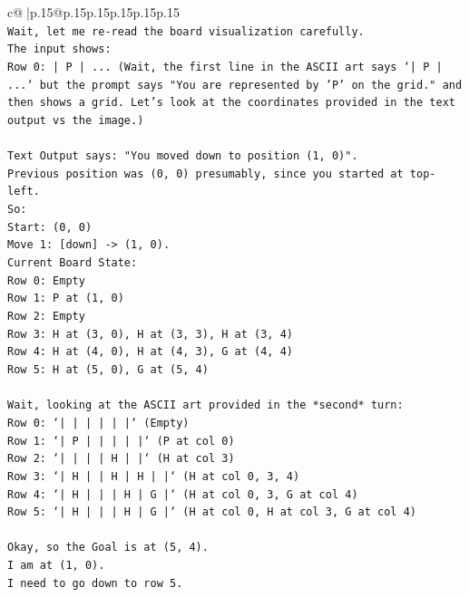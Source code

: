 \documentclass{article}
\begin{document}
{\begin{supertabular}{c@{$\;$}|p{.15\linewidth}@{}p{.15\linewidth}p{.15\linewidth}p{.15\linewidth}p{.15\linewidth}p{.15\linewidth}}
{{{\\ 
\texttt{Wait, let me re{-}read the board visualization carefully.} \\
\texttt{The input shows:} \\
\texttt{Row 0: | P | ... (Wait, the first line in the ASCII art says `| P | ...` but the prompt says "You are represented by 'P' on the grid." and then shows a grid. Let's look at the coordinates provided in the text output vs the image.)} \\
\\ 
\texttt{Text Output says: "You moved down to position (1, 0)".} \\
\texttt{Previous position was (0, 0) presumably, since you started at top{-}left.} \\
\texttt{So:} \\
\texttt{Start: (0, 0)} \\
\texttt{Move 1: {[}down{]} {-}> (1, 0).} \\
\texttt{Current Board State:} \\
\texttt{Row 0: Empty} \\
\texttt{Row 1: P at (1, 0)} \\
\texttt{Row 2: Empty} \\
\texttt{Row 3: H at (3, 0), H at (3, 3), H at (3, 4)} \\
\texttt{Row 4: H at (4, 0), H at (4, 3), G at (4, 4)} \\
\texttt{Row 5: H at (5, 0), G at (5, 4)} \\
\\ 
\texttt{Wait, looking at the ASCII art provided in the *second* turn:} \\
\texttt{Row 0: `|     |     |     |     |     |` (Empty)} \\
\texttt{Row 1: `|  P  |     |     |     |     |` (P at col 0)} \\
\texttt{Row 2: `|     |     |     |  H  |     |` (H at col 3)} \\
\texttt{Row 3: `|  H  |     |  H  |  H  |     |` (H at col 0, 3, 4)} \\
\texttt{Row 4: `|  H  |     |     |  H  |  G  |` (H at col 0, 3, G at col 4)} \\
\texttt{Row 5: `|  H  |     |     |  H  |  G  |` (H at col 0, H at col 3, G at col 4)} \\
\\ 
\texttt{Okay, so the Goal is at (5, 4).} \\
\texttt{I am at (1, 0).} \\
\texttt{I need to go down to row 5.} \\
}}}
\end{supertabular}}
\end{document}
